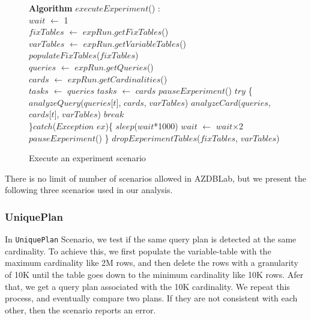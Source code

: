 \documentclass[conference]{IEEEtran}
\begin{document}
\begin{figure}[t]
\begin{center}
\begin{algorithmic}
{\bf Algorithm} $executeExperiment$() : \\
\STATE $wait$ $\leftarrow$ 1 \\
\STATE $fixTables$ $\leftarrow$ $expRun$.$getFixTables$() \\
\STATE $varTables$ $\leftarrow$ $expRun$.$getVariableTables$() \\
\STATE $populateFixTables$($fixTables$) \\
\STATE $queries$ $\leftarrow$ $expRun$.$getQueries$() \\
\STATE $cards$  $\leftarrow$ $expRun$.$getCardinalities$()\\
	\STATE $tasks$ $\leftarrow$ $queries$
\ELSE
	\STATE $tasks$ $\leftarrow$ $cards$
\ENDIF
{}
		\STATE $pauseExperiment$()
	\ENDIF
		\STATE\hspace{-0.3cm} $try$ \{
			\STATE $analyzeQuery$($queries$[$t$], $cards$, $varTables$)
		\ELSE
			\STATE $analyzeCard$($queries$, $cards$[$t$], $varTables$)
		\ENDIF
		\STATE$break$ \\
		\STATE\hspace{-0.3cm}\}$catch$($Exception$ $ex$)\{
			\STATE $sleep$($wait$*1000)
			\STATE  $wait$ $\leftarrow$ $wait${$\times$}2
		  		\STATE  $pauseExperiment$()
		  	\ENDIF
		\STATE\hspace{-0.3cm} \} 
	\ENDWHILE 	
\ENDFOR
\STATE $dropExperimentTables$($fixTables$, $varTables$)\\
\end{algorithmic}
\caption{Execute an experiment scenario\label{alg:scenario}}
\end{center}
\end{figure}

There is no limit of number of scenarios allowed in {\sc AZDBLab}, but 
we present the following three scenarios used in our analysis. 

\subsubsection{UniquePlan} 
In {\tt UniquePlan} Scenario, we test if the same query plan 
is detected at the same cardinality. To achieve this, 
we first populate the variable-table with the maximum cardinality like 2M rows, 
and then delete the rows with a granularity of 10K until the table goes down to 
the minimum cardinality like 10K rows. 
Afer that, we get a query plan associated with the 10K cardinality. 
We repeat this process, and eventually compare two plans. 
If they are not consistent with each other, then the scenario reports an error. 
\end{document}
